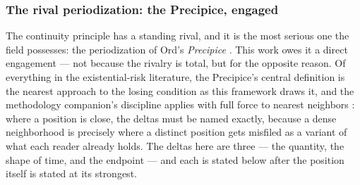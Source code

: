 \documentclass[11pt]{article}
\numberwithin{equation}{section}
\theoremstyle{plain}
\theoremstyle{definition}
\theoremstyle{remark}
\begin{document}
\subsubsection{The rival periodization: the Precipice, engaged}
\label{gc:subsub:precipice}

The continuity principle has a standing rival, and it is the most
serious one the field possesses: the periodization of Ord's
\emph{Precipice} \cite{Ord20}. This work owes it a direct engagement
--- not because the rivalry is total, but for the opposite reason. Of
everything in the existential-risk literature, the Precipice's central
definition is the nearest approach to the losing condition as this
framework draws it, and the methodology companion's discipline applies
with full force to nearest neighbors \cite{Ben26Method}: where a
position is close, the deltas must be named exactly, because a dense
neighborhood is precisely where a distinct position gets misfiled as a
variant of what each reader already holds. The deltas here are three
--- the quantity, the shape of time, and the endpoint --- and each is
stated below after the position itself is stated at its strongest.
\end{document}
